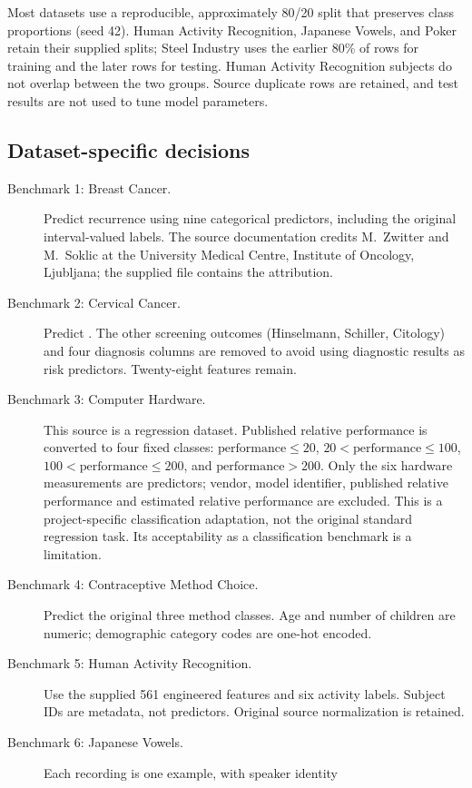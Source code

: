 \documentclass[11pt,letterpaper]{article}
\newcommand{\code}[1]{\texttt{\detokenize{#1}}}
\begin{document}
Most datasets use a reproducible, approximately 80/20 split that preserves
class proportions (seed 42). Human Activity Recognition, Japanese Vowels,
and Poker retain their supplied splits; Steel Industry uses the earlier
80\% of rows for training and the later rows for testing. Human Activity
Recognition subjects do not overlap between the two groups. Source duplicate
rows are retained, and test results are not used to tune model parameters.

\subsection{Dataset-specific decisions}
\begin{description}
\item[Benchmark 1: Breast Cancer.] Predict recurrence using nine categorical predictors,
including the original interval-valued labels. The source documentation credits
M.~Zwitter and M.~Soklic at the University Medical Centre, Institute of Oncology,
Ljubljana; the supplied \code{breast-cancer.names} file contains the attribution.
\item[Benchmark 2: Cervical Cancer.] Predict \code{Biopsy}. The other screening outcomes
(Hinselmann, Schiller, Citology) and four \code{Dx} diagnosis columns are removed
to avoid using diagnostic results as risk predictors. Twenty-eight features remain.
\item[Benchmark 3: Computer Hardware.] This source is a regression dataset.
Published relative performance is converted to four fixed classes:
$\text{performance}\leq20$, $20<\text{performance}\leq100$, $100<\text{performance}\leq200$,
and $\text{performance}>200$. Only the six hardware measurements are predictors;
vendor, model identifier, published relative performance and estimated relative performance are excluded.
This is a project-specific classification adaptation, not the original standard
regression task. Its acceptability as a classification benchmark is a limitation.
\item[Benchmark 4: Contraceptive Method Choice.] Predict the original three method classes.
Age and number of children are numeric; demographic category codes are one-hot encoded.
\item[Benchmark 5: Human Activity Recognition.] Use the supplied 561 engineered features and six activity labels.
Subject IDs are metadata, not predictors. Original source normalization is retained.
\item[Benchmark 6: Japanese Vowels.] Each recording is one example, with speaker identity

\end{description}
\end{document}
